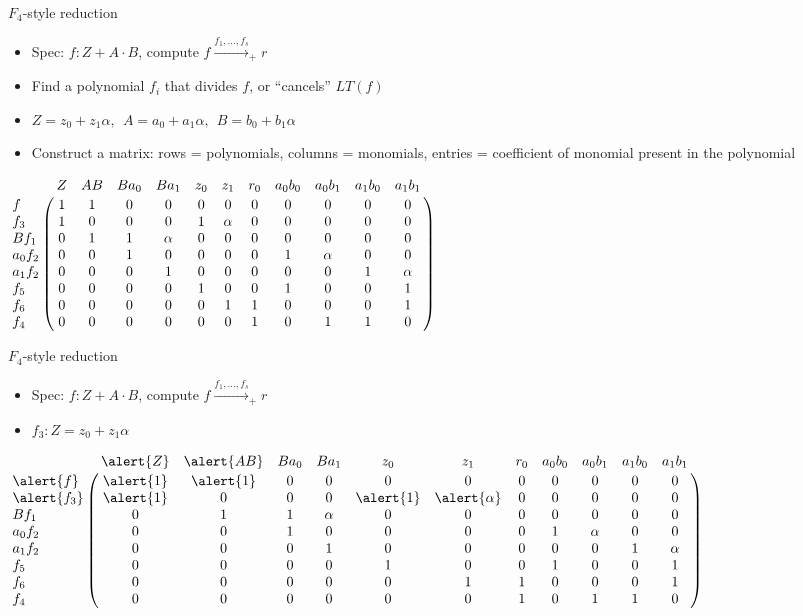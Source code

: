 \documentclass[xcolor=dvipsnames]{beamer}
\newcommand{\bi}{\begin{itemize}}
\newcommand{\ei}{\end{itemize}}
\begin{document}

\begin{frame}{\large{$F_4$-style reduction}}

\bi
\item Spec: $f: Z + A\cdot B$, compute $f \xrightarrow{f_1, \dots, f_s}_+ r$
\item Find a polynomial $f_i$ that divides $f$, or ``cancels'' $LT(f)$
\item $Z = z_0 + z_1\alpha, ~~ A = a_0 + a_1\alpha, ~~ B = b_0 +
  b_1\alpha$
\item Construct a matrix: rows = polynomials, columns = monomials,
  entries = coefficient of monomial present in the polynomial
\ei


\begin{math}
\bordermatrix{
~ & Z  & AB & Ba_0 & Ba_1 & z_0 & z_1 & r_0 & a_0b_0 & a_0b_1 & a_1b_0& a_1b_1\cr
f & 1 &1 &0 &0 &0 &0 &0 &0 &0 &0 &0\cr
f_3 & 1 &0 &0 & 0 &1 &\alpha &0 &0 &0 &0 &0 \cr
Bf_1 & 0 &1 &1 &\alpha &0 &0 &0 &0 &0 &0 &0\cr
a_0f_2 &0  &0 &1 &0 &0 & 0& 0&1 &\alpha &0 &0\cr
a_1f_2 &0  &0 &0 &1 &0 &0 &0 &0 &0 &1 &\alpha\cr
f_5  & 0 &0 &0 &0 &1 &0 &0 &1 &0 &0 &1\cr
f_6  & 0 &0 &0 &0 &0 &1 &1 &0 &0 &0 &1\cr
f_4 & 0 &0 &0 &0 &0 &0 &1 &0 &1 &1 &0\cr
}
\end{math}

\end{frame}





\begin{frame}{\large{$F_4$-style reduction}}

\bi
\item Spec: $f: Z + A\cdot B$, compute $f \xrightarrow{f_1, \dots, f_s}_+ r$
\item $f_3: Z = z_0 + z_1\alpha$ %
\ei

\begin{math}
\bordermatrix{
~ & \alert{Z}  & \alert{AB} & Ba_0 & Ba_1 & z_0 & z_1 & r_0 & a_0b_0 & a_0b_1 & a_1b_0& a_1b_1\cr
\alert{f} & \alert{1} &\alert{1} &0 &0 &0 &0 &0 &0 &0 &0 &0\cr
\alert{f_3} & \alert{1} &0 &0 & 0 &\alert{1} &\alert{\alpha} &0 &0 &0 &0 &0 \cr
Bf_1 & 0 &1 &1 &\alpha &0 &0 &0 &0 &0 &0 &0\cr
a_0f_2 &0  &0 &1 &0 &0 & 0& 0&1 &\alpha &0 &0\cr
a_1f_2 &0  &0 &0 &1 &0 &0 &0 &0 &0 &1 &\alpha\cr
f_5  & 0 &0 &0 &0 &1 &0 &0 &1 &0 &0 &1\cr
f_6  & 0 &0 &0 &0 &0 &1 &1 &0 &0 &0 &1\cr
f_4 & 0 &0 &0 &0 &0 &0 &1 &0 &1 &1 &0\cr
}
\end{math}

\end{frame}
\end{document}
